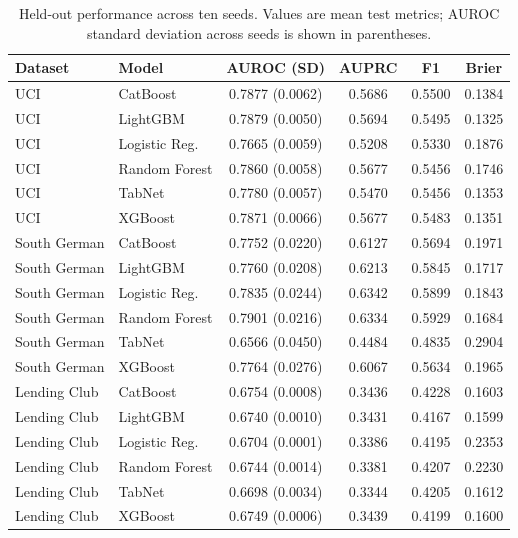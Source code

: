 \documentclass[pdflatex,sn-mathphys-num]{sn-jnl}
\begin{document}
\begin{table}[ht]
\centering\small
\caption{Held-out performance across ten seeds. Values are mean test metrics; AUROC standard deviation across seeds is shown in parentheses.}
\label{tab:all-seed-models}
\begin{tabular}{llcccc}
\hline
Dataset & Model & AUROC (SD) & AUPRC & F1 & Brier \\
\hline
UCI & CatBoost & 0.7877 (0.0062) & 0.5686 & 0.5500 & 0.1384 \\
UCI & LightGBM & 0.7879 (0.0050) & 0.5694 & 0.5495 & 0.1325 \\
UCI & Logistic Reg. & 0.7665 (0.0059) & 0.5208 & 0.5330 & 0.1876 \\
UCI & Random Forest & 0.7860 (0.0058) & 0.5677 & 0.5456 & 0.1746 \\
UCI & TabNet & 0.7780 (0.0057) & 0.5470 & 0.5456 & 0.1353 \\
UCI & XGBoost & 0.7871 (0.0066) & 0.5677 & 0.5483 & 0.1351 \\
\hline
South German & CatBoost & 0.7752 (0.0220) & 0.6127 & 0.5694 & 0.1971 \\
South German & LightGBM & 0.7760 (0.0208) & 0.6213 & 0.5845 & 0.1717 \\
South German & Logistic Reg. & 0.7835 (0.0244) & 0.6342 & 0.5899 & 0.1843 \\
South German & Random Forest & 0.7901 (0.0216) & 0.6334 & 0.5929 & 0.1684 \\
South German & TabNet & 0.6566 (0.0450) & 0.4484 & 0.4835 & 0.2904 \\
South German & XGBoost & 0.7764 (0.0276) & 0.6067 & 0.5634 & 0.1965 \\
\hline
Lending Club & CatBoost & 0.6754 (0.0008) & 0.3436 & 0.4228 & 0.1603 \\
Lending Club & LightGBM & 0.6740 (0.0010) & 0.3431 & 0.4167 & 0.1599 \\
Lending Club & Logistic Reg. & 0.6704 (0.0001) & 0.3386 & 0.4195 & 0.2353 \\
Lending Club & Random Forest & 0.6744 (0.0014) & 0.3381 & 0.4207 & 0.2230 \\
Lending Club & TabNet & 0.6698 (0.0034) & 0.3344 & 0.4205 & 0.1612 \\
Lending Club & XGBoost & 0.6749 (0.0006) & 0.3439 & 0.4199 & 0.1600 \\
\hline
\end{tabular}
\end{table}
\end{document}
